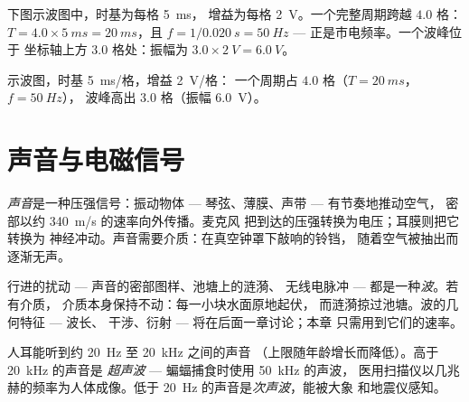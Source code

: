 \begin{example}[完整读数示例]\label{ex:g10:signals-and-waves:reading}
下图示波图中，时基为每格 \qty{5}{ms}，
增益为每格 \qty{2}{V}。一个完整周期跨越 $4.0$ 格：
$T = 4.0 \times \qty{5}{ms} = \qty{20}{ms}$，且
$f = 1/\qty{0.020}{s} = \qty{50}{Hz}$ --- 正是市电频率。一个波峰位于
坐标轴上方 $3.0$ 格处：振幅为
$3.0 \times \qty{2}{V} = \qty{6.0}{V}$。
\end{example}

\begin{omfigure}

{\small 示波图，时基 \qty{5}{ms}/格，增益 \qty{2}{V}/格：
一个周期占 $4.0$ 格（$T = \qty{20}{ms}$，$f = \qty{50}{Hz}$），
波峰高出 $3.0$ 格（振幅 \qty{6.0}{V}）。}
\end{omfigure}

\section{声音与电磁信号}

\begin{definition}[声音]\label{def:g10:signals-and-waves:sound}
\emph{声音}是一种压强信号：振动物体 ---
琴弦、薄膜、声带 --- 有节奏地推动空气，
密部以约 \qty{340}{m/s} 的速率向外传播。麦克风
把到达的压强转换为电压；耳膜则把它转换为
神经冲动。声音需要介质：在真空钟罩下敲响的铃铛，
随着空气被抽出而逐渐无声。
\end{definition}

\begin{definition}[波]\label{def:g10:signals-and-waves:wave}
行进的扰动 --- 声音的密部图样、池塘上的涟漪、
无线电脉冲 --- 都是一种\emph{波}。若有介质，
介质本身保持不动：每一小块水面原地起伏，
而涟漪掠过池塘。波的几何特征 --- 波长、
干涉、衍射 --- 将在后面一章讨论；本章
只需用到它们的速率。
\end{definition}

\begin{definition}[超声波与次声波]\label{def:g10:signals-and-waves:ultrasound}
人耳能听到约 \qty{20}{Hz} 至 \qty{20}{kHz} 之间的声音
（上限随年龄增长而降低）。高于 \qty{20}{kHz} 的声音是
\emph{超声波} --- 蝙蝠捕食时使用 \qty{50}{kHz} 的声波，
医用扫描仪以几兆赫的频率为人体成像。低于
\qty{20}{Hz} 的声音是\emph{次声波}，能被大象
和地震仪感知。
\end{definition}

